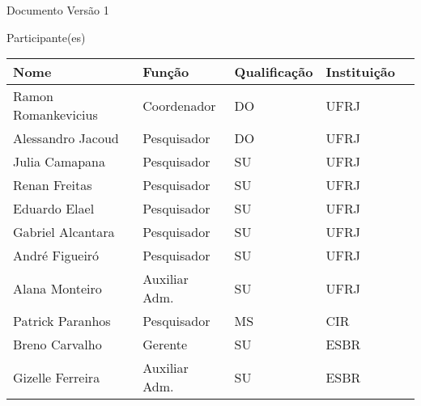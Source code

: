 \newpage



\thispagestyle{empty}


\begin{center}

  {\LARGE Documento Versão 1}
  
 \vfill



  {\LARGE Participante(es)}
  \vspace{0.50cm}


  \begin{center}
    \begin{tabular}{| l | l | l | l | l |}
    \hline
    Nome & Função & Qualificação & Instituição \\ \hline
    Ramon Romankevicius & Coordenador & DO & UFRJ \\ \hline
    Alessandro Jacoud & Pesquisador & DO & UFRJ \\ \hline
   Julia Camapana & Pesquisador & SU & UFRJ \\ \hline
   Renan Freitas & Pesquisador & SU & UFRJ \\ \hline
  Eduardo Elael & Pesquisador & SU & UFRJ \\ \hline
  Gabriel Alcantara & Pesquisador & SU & UFRJ \\ \hline
   André Figueiró & Pesquisador & SU & UFRJ \\ \hline
   Alana Monteiro  & Auxiliar Adm. & SU & UFRJ \\ \hline
    Patrick  Paranhos & Pesquisador & MS & CIR \\ \hline
  Breno Carvalho & Gerente & SU & ESBR \\ \hline
  Gizelle Ferreira & Auxiliar Adm. & SU & ESBR \\ \hline

    
    \hline 
    \end{tabular}
\end{center}






\end{center}

\newpage

\hypersetup{pageanchor=true}

